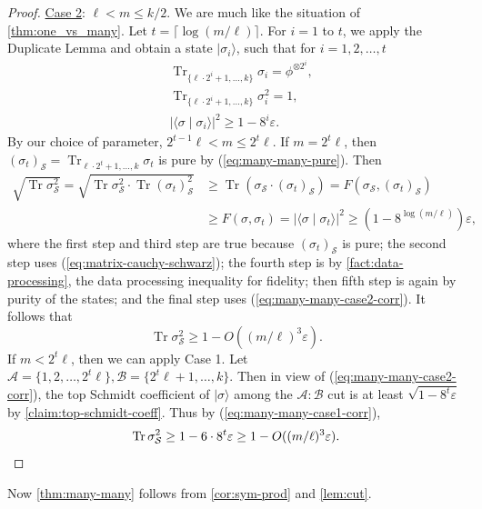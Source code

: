 \documentclass[10pt,a4paper]{article}
\theoremstyle{remark}
\def\epsilon{\varepsilon}
\newcommand{\cA}{\mathcal{A}}
\newcommand{\cB}{\mathcal{B}}
\newcommand{\cS}{\mathcal{S}}
\newcommand{\1}[1]{\mathds{1}{[#1]}}
\newcommand{\ket}[1]{\lvert #1\rangle}
\newcommand{\trace}{\operatorname{Tr}}
\numberwithin{equation}{section}
\begin{document}
\begin{proof}
\uline{Case 2}: $\ell < m \le k/2$. We are much like the situation of \cref{thm:one_vs_many}. Let $t = \lceil \log (m / \ell) \rceil$. For $i=1$ to $t$, we apply the Duplicate Lemma and obtain a state $\ket{\sigma_i}$, such that for $i=1,2,\ldots, t$
\begin{align}
    &\trace_{\{\ell\cdot 2^i+1,\ldots, k\}}\sigma_i = \phi ^{\otimes 2^i},
    \nonumber \\
    &\trace_{\{\ell\cdot 2^i+1,\ldots, k\}}\sigma_i^2 = 1,
    \label{eq:many-many-pure} \\
    &|\langle \sigma \mid \sigma_i \rangle|^2 \ge 1-8^i \epsilon.
    \label{eq:many-many-case2-corr}
\end{align}
By our choice of parameter, $2^{t-1}\ell < m \le 2^{t}\ell$. If $m=2^t \ell$, then $(\sigma_t)_\cS = \trace_{\ell\cdot2^t+1,\ldots,k}\sigma_t$ is pure by (\ref{eq:many-many-pure}). Then  
\begin{align*}
    \sqrt {\trace\sigma_\cS^2} =  \sqrt{\trace \sigma_\cS ^2 \cdot \trace (\sigma_t)_\cS^2} &\ge \trace(\sigma_\cS\cdot (\sigma_t)_\cS) = F(\sigma_\cS, (\sigma_t)_\cS) \\
    &\ge F(\sigma, \sigma_t)  = |\langle \sigma \mid \sigma_t\rangle|^2 \ge (1-8^{\log(m/\ell)})\epsilon,
\end{align*}
where the first step and third step are true because $(\sigma_t)_\cS$ is pure; the second step uses (\ref{eq:matrix-cauchy-schwarz}); the fourth step is by \cref{fact:data-processing}, the data processing inequality for fidelity; then fifth step is again by purity of the states; and the final step uses (\ref{eq:many-many-case2-corr}). It follows that
\[
    \trace \sigma_\cS^2 \ge 1 - O((m/\ell)^3\epsilon).
\]
If $m<2^t\ell$, then we can apply Case 1. 
Let $\cA= \{1,2,\ldots,2^t\ell\}, \cB = \{2^t\ell+1, \ldots, k\}$. Then in view of (\ref{eq:many-many-case2-corr}), the top Schmidt coefficient of $\ket\sigma$ among the $\cA : \cB$ cut is at least $\sqrt{1-8^t\epsilon}$ by \cref{claim:top-schmidt-coeff}. Thus by (\ref{eq:many-many-case1-corr}),
\[
    \trace \sigma_\cS^2 \ge 1-6\cdot 8^t\epsilon\ge 1-O((m/\ell)^3\epsilon).
\qedhere
\]
\end{proof}

Now \cref{thm:many-many} follows from \cref{cor:sym-prod} and \cref{lem:cut}.
\end{document}
